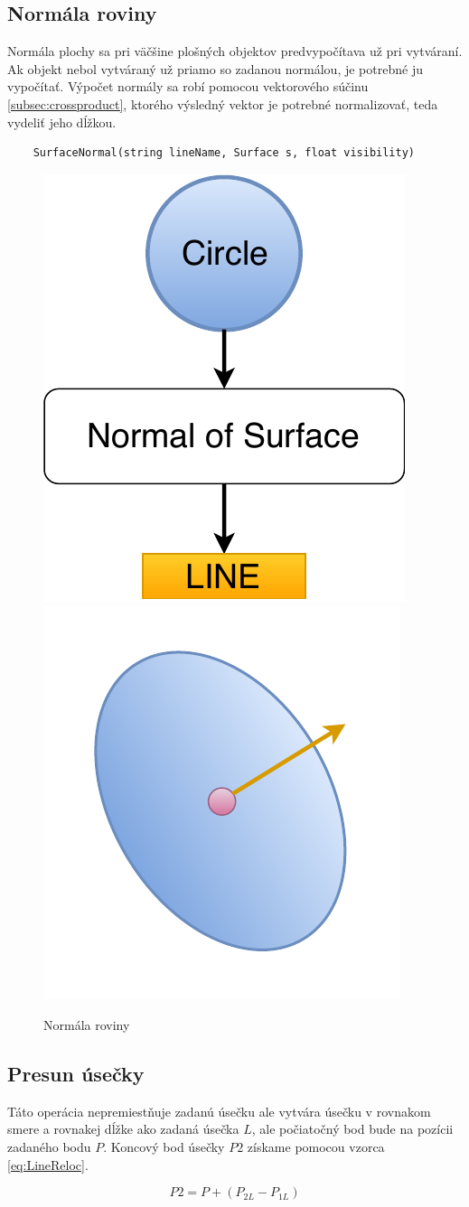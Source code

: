 \subsection{Normála roviny}
Normála plochy sa pri väčšine plošných objektov predvypočítava už pri vytváraní. Ak objekt nebol vytváraný už priamo so zadanou normálou, je potrebné ju vypočítať. Výpočet normály sa robí pomocou vektorového súčinu \ref{subsec:crossproduct}, ktorého výsledný vektor je potrebné normalizovať, teda vydeliť jeho dĺžkou.


\begin{lstlisting}
	SurfaceNormal(string lineName, Surface s, float visibility)
\end{lstlisting}


\begin{figure}[H]
	\centering
	\includegraphics[height=0.3\textwidth]{obrazky-figures/Diagram/Line/DP Navrh operacii-1D - LineSurfaceNormal.pdf}
	\includegraphics[height=0.3\textwidth]{obrazky-figures/Diagram/Draw/2Line/DP Navrh operacii-1D - LineSurfaceNormal.pdf}
	\caption{Normála roviny}
	\label{fig:1}
\end{figure}



\subsection{Presun úsečky}
Táto operácia nepremiestňuje zadanú úsečku ale vytvára úsečku v rovnakom smere a rovnakej dĺžke ako zadaná úsečka $L$, ale počiatočný bod bude na pozícii zadaného bodu $P$. 
Koncový bod úsečky $P2$ získame pomocou vzorca \ref{eq:LineReloc}. 

\begin{equation}
    P2 = P + (P_{2L}-P_{1L})
    \label{eq:LineReloc}
\end{equation}


